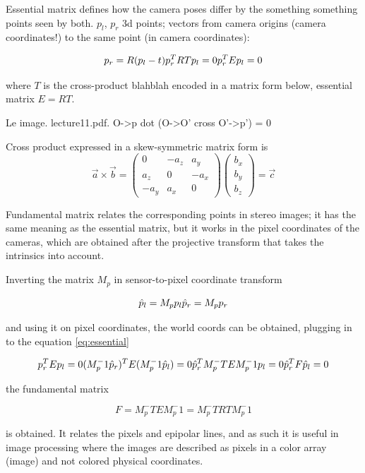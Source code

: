 Essential matrix defines how the camera poses differ by the something something points seen by both. $p_l$, $p_r$ 3d points; vectors from camera origins (camera coordinates!) to the same point (in camera coordinates):

\[ \label{eq:essential}
	p_r = R (p_l - t) \\
	p_r^T R T p_l = 0 \\
	p_r^T E p_l = 0
\]

where $T$ is the cross-product blahblah encoded in a matrix form below, essential matrix $E = R T$.

Le image. lecture11.pdf. O->p dot (O->O' cross O'->p') = 0

Cross product expressed in a skew-symmetric matrix form is
\begin{equation}
\vec a \times \vec b =
\begin{pmatrix}
	 0   & -a_z &  a_y\\
	 a_z &  0   & -a_x\\
	-a_y &  a_x & 0
\end{pmatrix}
\begin{pmatrix}
	b_x\\b_y\\b_z
\end{pmatrix}
= \vec c
\end{equation}

Fundamental matrix relates the corresponding points in stereo images; it has the same meaning as the essential matrix, but it works in the pixel coordinates of the cameras, which are obtained after the projective transform that takes the intrinsics into account.

Inverting the matrix $M_p$ in sensor-to-pixel coordinate transform

\[
\hat p_l = M_p p_l\\
\hat p_r = M_p p_r
\]

and using it on pixel coordinates, the world coords can be obtained, plugging in to the equation \ref{eq:essential}

\[
p_r^T E p_l = 0\\
(M_p^-1 \hat p_r)^T E (M_p^-1 \hat p_l) = 0\\
\hat p_r^T M_p^-T E M_p^-1 p_l = 0\\
\hat p_r^T F \hat p_l = 0
\]

the fundamental matrix

\[
F = M_p^-T E M_p^-1 = M_p^-T R T M_p^-1
\]

is obtained. It relates the pixels and epipolar lines, and as such it is useful in image processing where the images are described as pixels in a color array (image) and not colored physical coordinates.

